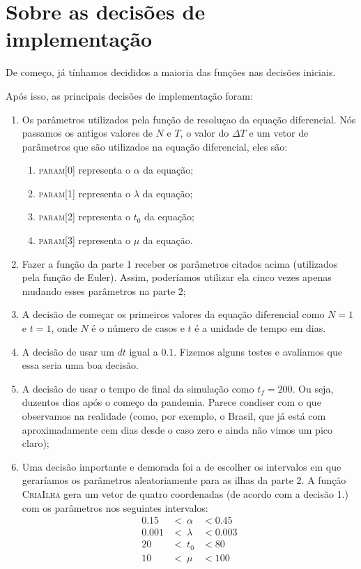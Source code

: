 \documentclass[12pt, a4paper, oneside]{article}
\begin{document}
\section{Sobre as decisões de implementação}

De começo, já tínhamos decididos a maioria das funções nas decisões iniciais.

Após isso, as principais decisões de implementação foram:

\begin{enumerate}
\item Os parâmetros utilizados pela função de resoluçao da equação diferencial. 
Nós passamos os antigos valores de $N$ e $T$, o valor do $\Delta T$ e um 
vetor de parâmetros que são utilizados na equação diferencial, eles são:
\begin{enumerate}
    \item \textsc{param[0]} representa o $\alpha$ da equação;
    \item \textsc{param[1]} representa o $\lambda$ da equação;
    \item \textsc{param[2]} representa o $t_0$ da equação;
    \item \textsc{param[3]} representa o $\mu$ da equação.
\end{enumerate}

\item Fazer a função da parte 1 receber os parâmetros citados acima (utilizados
pela função de Euler). Assim, poderíamos utilizar ela cinco vezes apenas mudando
esses parâmetros na parte 2;

\item A decisão de começar os primeiros valores da equação diferencial como 
$N = 1$ e $t = 1$, onde $N$ é o número de casos e $t$ é a unidade de tempo em dias.

\item A decisão de usar um $dt$ igual a $0.1$. Fizemos alguns testes e avaliamos 
que essa seria uma boa decisão.

\item A decisão de usar o tempo de final da simulação como $t_f = 200$. Ou seja,
duzentos dias após o começo da pandemia. Parece condiser com o que observamos 
na realidade (como, por exemplo, o Brasil, que já está com aproximadamente
cem dias desde o caso zero e ainda não vimos um pico claro);

\item Uma decisão importante e demorada foi a de escolher os intervalos em que
geraríamos os parâmetros aleatoriamente para as ilhas da parte 2. A função 
\textsc{CriaIlha} gera um vetor de quatro coordenadas (de acordo com a decisão 1.)
com os parâmetros nos seguintes intervalos:
\begin{eqnarray}
0.15 &<~ \alpha &< 0.45 \\ 0.001 &<~ \lambda &< 0.003 \\ 20 &<~ t_0 &< 80 \\ 10 &<~ \mu &< 100
\end{eqnarray}


\end{enumerate}
\end{document}

